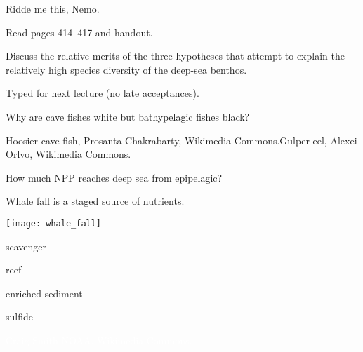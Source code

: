 \documentclass[t]{beamer}
\begin{document}

\begin{frame}[t]{Ridde me this, Nemo.}

	\hangpara Read pages 414--417 and handout.

	\hangpara Discuss the relative merits of the three hypotheses that attempt to explain the relatively high species diversity of the deep-sea benthos.

	\hangpara Typed for next lecture (no late acceptances).
	
\end{frame}

{
\begin{frame}[b]{Why are cave fishes white but bathypelagic fishes black?}

\tiny Hoosier cave fish, Prosanta Chakrabarty, Wikimedia Commons.\hfill Gulper eel, Alexei Orlvo, Wikimedia Commons.
\end{frame}}

{
\begin{frame}[t]{How much NPP reaches deep sea from epipelagic?}
\end{frame}}

\begin{frame}[t]{Whale fall is a staged source of nutrients.}

\vspace*{-\baselineskip}

	\begin{multicols}{2}
		{\centering
		\texttt{[image: whale\_fall]}\par}

	\columnbreak

		\hangpara scavenger

		\hangpara reef

		\hangpara enriched sediment

		\hangpara sulfide

	\end{multicols}


\end{frame}

{
\begin{frame}[b]

\tiny\hfill\textcolor{white}{Craig Smith NOAA, Wikimedia Commons.}
\end{frame}}
\end{document}
